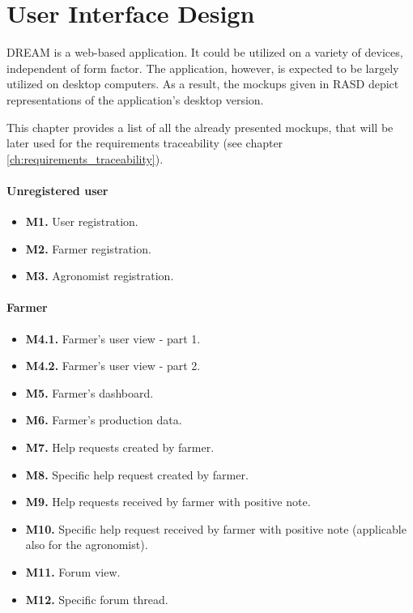 \chapter{User Interface Design}

DREAM is a web-based application. It could be utilized on a variety of devices, independent of form factor. The application, however, is expected to be largely utilized on desktop computers. As a result, the mockups given in RASD depict representations of the application's desktop version.

This chapter provides a list of all the already presented mockups, that will be later used for the requirements traceability (see chapter \ref{ch:requirements_traceability}).

\subsubsection{Unregistered user}

\begin{itemize}
    \item \textbf{M1.} User registration.
    \item \textbf{M2.} Farmer registration.
    \item \textbf{M3.} Agronomist registration.
\end{itemize}

\subsubsection{Farmer}

\begin{itemize}
    \item \textbf{M4.1.} Farmer's user view - part 1.
    \item \textbf{M4.2.} Farmer's user view - part 2.
    \item \textbf{M5.} Farmer's dashboard.
    \item \textbf{M6.} Farmer's production data.
    \item \textbf{M7.} Help requests created by farmer.
    \item \textbf{M8.} Specific help request created by farmer.
    \item \textbf{M9.} Help requests received by farmer with positive note.
    \item \textbf{M10.} Specific help request received by farmer with positive note (applicable also for the agronomist).
    \item \textbf{M11.} Forum view.
    \item \textbf{M12.} Specific forum thread.
\end{itemize}

